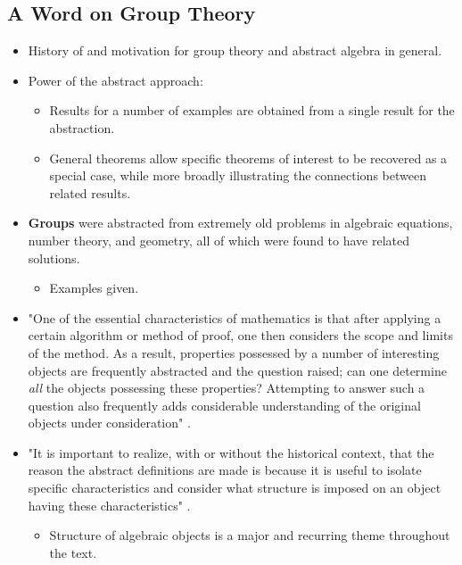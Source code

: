 \documentclass[../notes.tex]{subfiles}
\begin{document}
\subsection*{A Word on Group Theory}
\begin{itemize}
    \item {}History of and motivation for group theory and abstract algebra in general.
    \item Power of the abstract approach:
    \begin{itemize}
        \item Results for a number of examples are obtained from a single result for the abstraction.
        \item General theorems allow specific theorems of interest to be recovered as a special case, while more broadly illustrating the connections between related results.
    \end{itemize}
    \item \textbf{Groups} were abstracted from extremely old problems in algebraic equations, number theory, and geometry, all of which were found to have related solutions.
    \begin{itemize}
        \item Examples given.
    \end{itemize}
    \item "One of the essential characteristics of mathematics is that after applying a certain algorithm or method of proof, one then considers the scope and limits of the method. As a result, properties possessed by a number of interesting objects are frequently abstracted and the question raised; can one determine \emph{all} the objects possessing these properties? Attempting to answer such a question also frequently adds considerable understanding of the original objects under consideration" \parencite[13]{bib:DummitFoote}.
    \item "It is important to realize, with or without the historical context, that the reason the abstract definitions are made is because it is useful to isolate specific characteristics and consider what structure is imposed on an object having these characteristics" \parencite[15]{bib:DummitFoote}.
    \begin{itemize}
        \item Structure of algebraic objects is a major and recurring theme throughout the text.
    \end{itemize}
\end{itemize}
\end{document}
